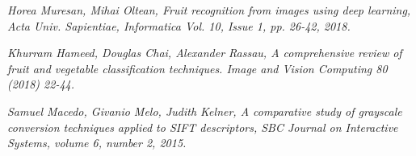 \documentclass{article}
\begin{document}
\begin{thebibliography}{9}

\textit{Horea Muresan, Mihai Oltean, Fruit recognition from images using deep learning, Acta Univ. Sapientiae, Informatica Vol. 10, Issue 1, pp. 26-42, 2018.}

\textit{Khurram Hameed, Douglas Chai, Alexander Rassau, A comprehensive review of fruit and vegetable classification techniques. Image and Vision Computing 80 (2018) 22-44.}

\textit{Samuel Macedo, Givanio Melo, Judith Kelner, A comparative study of grayscale conversion techniques applied to SIFT descriptors, SBC Journal on Interactive Systems, volume 6, number 2, 2015.}

\end{thebibliography} 
\end{document}
